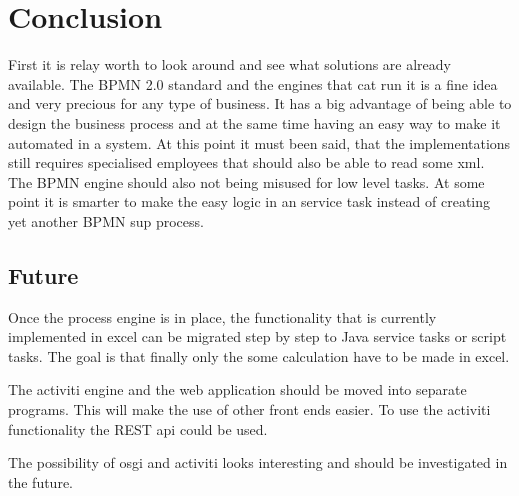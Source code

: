 \documentclass[paper=a4,twoside=false,BCOR=0mm,DIV=calc,fontsize=12pt]{scrartcl}
\begin{document}




\section{Conclusion}
First it is relay worth to look around and see what solutions are already available. The BPMN 2.0 standard and the engines that cat run it is a fine 
idea and very precious for any type of business. It has a big advantage of being able to design the business process and at the same time having an easy way to make it automated in a system.
At this point it must been said, that the implementations still requires specialised employees that should also be able to read some xml. The BPMN engine should also not being misused for low level tasks. At some point it is smarter to make the easy logic in an service task instead of creating yet another BPMN sup process.




\subsection{Future}
Once the process engine is in place, the functionality that is currently implemented in excel can be migrated step by step to Java service tasks or script tasks. The goal is that finally only the some calculation have to be made in excel.

The activiti engine and the web application should be moved into separate programs. This will make the use of other front ends easier. To use the activiti functionality the REST api could be used.

The possibility of osgi and activiti \cite{osgiactivit} looks interesting and should be investigated in the future.


\newpage
\end{document}
